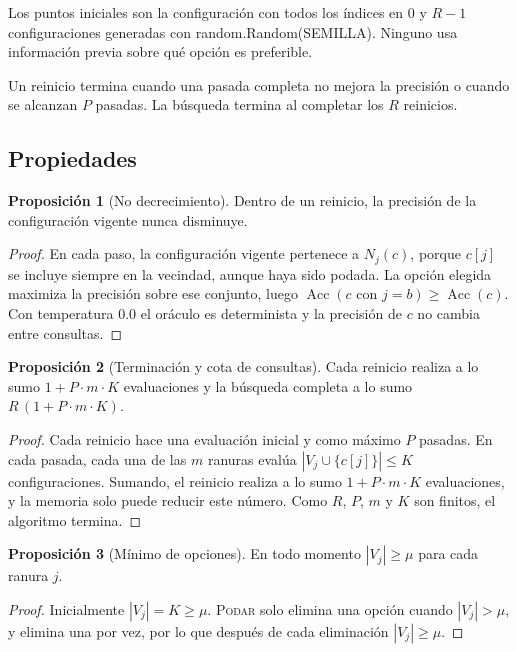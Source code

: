 \documentclass[12pt,letterpaper]{article}
\theoremstyle{definition}
\newtheorem{proposicion}{Proposición}
\newcommand{\Acc}{\operatorname{Acc}}
\begin{document}
Los puntos iniciales son la configuración con todos los índices en 0 y $R-1$ configuraciones generadas con random.Random(SEMILLA). Ninguno usa información previa sobre qué opción es preferible.

Un reinicio termina cuando una pasada completa no mejora la precisión o cuando se alcanzan $P$ pasadas. La búsqueda termina al completar los $R$ reinicios.

\subsection{Propiedades}\label{sec:propiedades}

\begin{proposicion}[No decrecimiento]\label{prop:monotonia}
Dentro de un reinicio, la precisión de la configuración vigente nunca disminuye.
\end{proposicion}
\begin{proof}
En cada paso, la configuración vigente pertenece a $N_j(c)$, porque $c[j]$ se incluye siempre en la vecindad, aunque haya sido podada. La opción elegida maximiza la precisión sobre ese conjunto, luego $\Acc(c \text{ con } j = b) \geq \Acc(c)$. Con temperatura 0.0 el oráculo es determinista y la precisión de $c$ no cambia entre consultas.
\end{proof}

\begin{proposicion}[Terminación y cota de consultas]\label{prop:cota}
Cada reinicio realiza a lo sumo $1 + P \cdot m \cdot K$ evaluaciones y la búsqueda completa a lo sumo $R\,(1 + P \cdot m \cdot K)$.
\end{proposicion}
\begin{proof}
Cada reinicio hace una evaluación inicial y como máximo $P$ pasadas. En cada pasada, cada una de las $m$ ranuras evalúa $|V_j \cup \{c[j]\}| \leq K$ configuraciones. Sumando, el reinicio realiza a lo sumo $1 + P \cdot m \cdot K$ evaluaciones, y la memoria solo puede reducir este número. Como $R$, $P$, $m$ y $K$ son finitos, el algoritmo termina.
\end{proof}

\begin{proposicion}[Mínimo de opciones]\label{prop:minimo}
En todo momento $|V_j| \geq \mu$ para cada ranura $j$.
\end{proposicion}
\begin{proof}
Inicialmente $|V_j| = K \geq \mu$. \textsc{Podar} solo elimina una opción cuando $|V_j| > \mu$, y elimina una por vez, por lo que después de cada eliminación $|V_j| \geq \mu$.
\end{proof}
\end{document}
